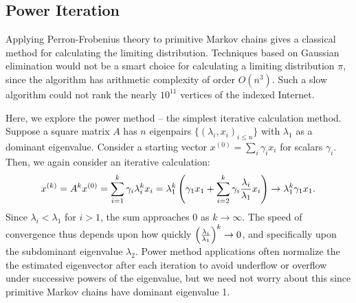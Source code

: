 \documentclass[../exploring-pagerank.tex]{subfiles}
\begin{document}
    \subsection{Power Iteration}
    Applying Perron-Frobenius theory to primitive Markov chains gives a classical method for calculating the limiting distribution. Techniques based on Gaussian elimination would not be a smart choice for calculating a limiting distribution $\pi$, since the algorithm has arithmetic complexity of order $O(n^3)$. Such a slow algorithm could not rank the nearly $10^{11}$ vertices of the indexed Internet. 
    
    Here, we explore the power method -- the simplest iterative calculation method. Suppose a square matrix $A$ has $n$ eigenpairs $\{ (\lambda_i,x_i)_{i\leq n} \}$ with $\lambda_1$ as a dominant eigenvalue. Consider a starting vector $x^{(0)}=\sum_i{\gamma_i x_i}$ for scalars $\gamma_i$. Then, we again consider an iterative calculation:
	\begin{equation}
		x^{(k)} = A^k x^{(0)} = \sum_{i=1}^{k}{\gamma_i \lambda_i^k x_i} = \lambda_1^k\left( \gamma_1 x_1 + \sum_{i=2}^{k}{\gamma_i \frac{\lambda_i}{\lambda_1} x_i} \right) \to \lambda_1^k \gamma_1 x_1.
	\end{equation}
    Since $\lambda_i<\lambda_1$ for $i>1$, the sum approaches 0 as $k\to\infty$. The speed of convergence thus depends upon how quickly $\left( \frac{\lambda_i}{\lambda_1} \right)^k \to 0$, and specifically upon the subdominant eigenvalue $\lambda_2$. Power method applications often normalize the the estimated eigenvector after each iteration to avoid underflow or overflow under successive powers of the eigenvalue, but we need not worry about this since primitive Markov chains have dominant eigenvalue 1.
\end{document}
